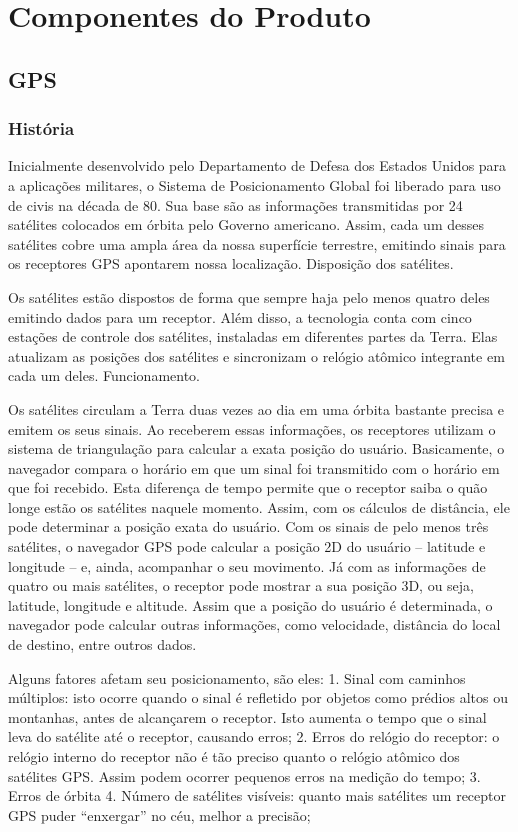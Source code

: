 \chapter[Componentes do Produto]{Componentes do Produto}

\section{GPS}

\subsection{História}
	Inicialmente desenvolvido pelo Departamento de Defesa dos Estados Unidos para a aplicações militares, o Sistema de Posicionamento Global foi liberado para uso de civis na década de 80. Sua base são as informações transmitidas por 24 satélites colocados em órbita pelo Governo americano. Assim, cada um desses satélites cobre uma ampla área da nossa superfície terrestre, emitindo sinais para os receptores GPS apontarem nossa localização.
Disposição dos satélites.

	Os satélites estão dispostos de forma que sempre haja pelo menos quatro deles emitindo dados para um receptor. Além disso, a tecnologia conta com cinco estações de controle dos satélites, instaladas em diferentes partes da Terra. Elas atualizam as posições dos satélites e sincronizam o relógio atômico integrante em cada um deles.
Funcionamento.

Os satélites circulam a Terra duas vezes ao dia em uma órbita bastante precisa e emitem os seus sinais. Ao receberem essas informações, os receptores utilizam o sistema de triangulação para calcular a exata posição do usuário. Basicamente, o navegador compara o horário em que um sinal foi transmitido com o horário em que foi recebido. Esta diferença de tempo permite que o receptor saiba o quão longe estão os satélites naquele momento. Assim, com os cálculos de distância, ele pode determinar a posição exata do usuário. Com os sinais de pelo menos três satélites, o navegador GPS pode calcular a posição 2D do usuário – latitude e longitude – e, ainda, acompanhar o seu movimento. Já com as informações de quatro ou mais satélites, o receptor pode mostrar a sua posição 3D, ou seja, latitude, longitude e altitude. Assim que a posição do usuário é determinada, o navegador pode calcular outras informações, como velocidade, distância do local de destino, entre outros dados.


	Alguns fatores afetam seu posicionamento, são eles:
1. Sinal com caminhos múltiplos: isto ocorre quando o sinal é refletido por objetos como prédios altos ou montanhas, antes de alcançarem o receptor. Isto aumenta o tempo que o sinal leva do satélite até o receptor, causando erros;
2. Erros do relógio do receptor: o relógio interno do receptor não é tão preciso quanto o relógio atômico dos satélites GPS. Assim podem ocorrer pequenos erros na medição do tempo;
3. Erros de órbita
4. Número de satélites visíveis: quanto mais satélites um receptor GPS puder “enxergar” no céu, melhor a precisão;

